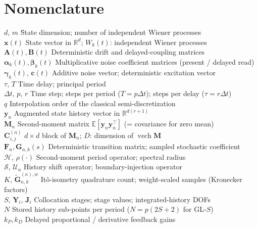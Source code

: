 \documentclass[preprint,12pt]{elsarticle}
\begin{document}
\section*{Nomenclature}
\begin{tabbing}
  $d$, $m$ \quad\quad \= State dimension; number of independent Wiener processes \\
  $\mathbf{x}(t)$ \> State vector in $\mathbb{R}^d$; $W_k(t)$: independent Wiener processes \\
  $\mathbf{A}(t), \mathbf{B}(t)$ \> Deterministic drift and delayed-coupling matrices \\
  $\boldsymbol{\alpha}_k(t), \boldsymbol{\beta}_k(t)$ \> Multiplicative noise coefficient matrices (present / delayed read) \\
  $\boldsymbol{\gamma}_k(t)$, $\mathbf{c}(t)$ \> Additive noise vector; deterministic excitation vector \\
  $\tau$, $T$ \> Time delay; principal period \\
  $\Delta t$, $p$, $r$ \> Time step; steps per period ($T = p\Delta t$); steps per delay ($\tau = r\Delta t$) \\
  $q$ \> Interpolation order of the classical semi-discretization \\
  $\mathbf{y}_n$ \> Augmented state history vector in $\mathbb{R}^{d(r+1)}$ \\
  $\mathbf{M}_n$ \> Second-moment matrix $\mathbb{E}[\mathbf{y}_n \mathbf{y}_n^\top]$ (= covariance for zero mean) \\
  $\mathbf{C}_{i,j}^{(n)}$ \> $d \times d$ block of $\mathbf{M}_n$; $D$: dimension of $\operatorname{vech}\mathbf{M}$ \\
  $\mathbf{F}_n, \mathbf{G}_{n,k}(s)$ \> Deterministic transition matrix; sampled stochastic coefficient \\
  $\mathcal{H}$, $\rho(\cdot)$ \> Second-moment period operator; spectral radius \\
  $\mathcal{S}$, $\mathcal{U}_n$ \> History shift operator; boundary-injection operator \\
  $K$, $\tilde{\mathbf{G}}^{(\kappa),w}_{n,k}$ \> It\^o-isometry quadrature count; weight-scaled samples (Kronecker factors) \\
  $S$, $\mathbf{Y}_i$, $\mathbf{J}_i$ \> Collocation stages; stage values; integrated-history DOFs \\
  $N$ \> Stored history sub-points per period ($N = p(2S+2)$ for GL-$S$) \\
  $k_P, k_D$ \> Delayed proportional / derivative feedback gains \\

\end{tabbing}
\end{document}
